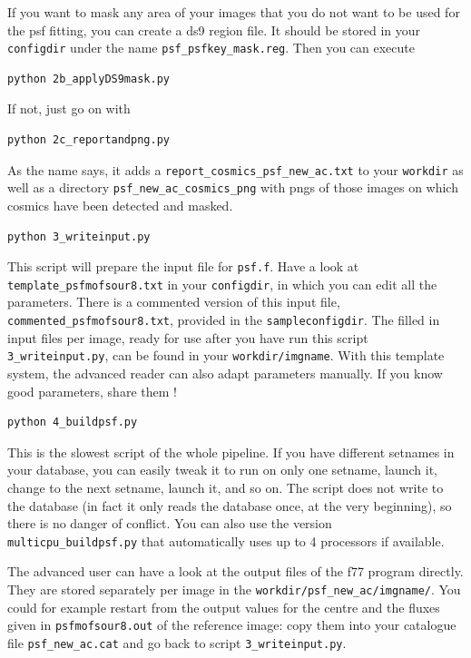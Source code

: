 If you want to mask any area of your images that you do not want to be used for the psf fitting, you can create a ds9 region file. It should be stored in your \verb+configdir+ under the name \verb+psf_psfkey_mask.reg+. Then you can execute 

\begin{Verbatim}
python 2b_applyDS9mask.py
\end{Verbatim}
If not, just go on with

\begin{Verbatim}
python 2c_reportandpng.py
\end{Verbatim}
As the name says, it adds a \verb+report_cosmics_psf_new_ac.txt+ to your \verb+workdir+ as well as a directory \verb+psf_new_ac_cosmics_png+ with pngs of those images on which cosmics have been detected and masked.

\begin{Verbatim}
python 3_writeinput.py
\end{Verbatim}
This script will prepare the input file for \verb+psf.f+. Have a look at \verb+template_psfmofsour8.txt+ in your \verb+configdir+, in which you can edit all the parameters. There is a commented version of this input file, \verb+commented_psfmofsour8.txt+, provided in the \verb+sampleconfigdir+. The filled in input files per image, ready for use after you have run this script \verb+3_writeinput.py+, can be found in your \verb+workdir/imgname+.
With this template system, the advanced reader can also adapt parameters manually. If you know good parameters, share them !

\begin{Verbatim}
python 4_buildpsf.py
\end{Verbatim}
This is the slowest script of the whole pipeline. If you have different setnames in your database, you can easily tweak it to run on only one setname, launch it, change to the next setname, launch it, and so on. The script does not write to the database (in fact it only reads the database once, at the very beginning), so there is no danger of conflict.
You can also use the version \verb+multicpu_buildpsf.py+ that automatically uses up to 4 processors if available.

The advanced user can have a look at the output files of the f77 program directly. They are stored separately per image in the \verb+workdir/psf_new_ac/imgname/+. You could for example restart from the output values for the centre and the fluxes given in \verb+psfmofsour8.out+ of the reference image: copy them into your catalogue file \verb+psf_new_ac.cat+ and go back to script \verb+3_writeinput.py+. 

